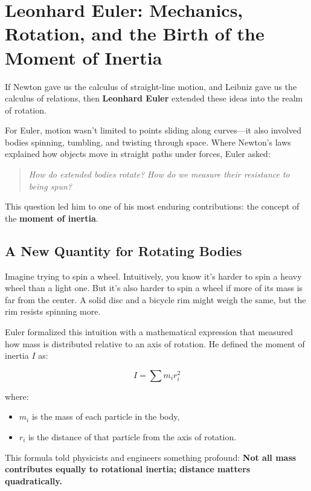 \section{Leonhard Euler: Mechanics, Rotation, and the Birth of the Moment of Inertia}

If Newton gave us the calculus of straight-line motion, and Leibniz gave us the calculus of relations, then \textbf{Leonhard Euler} extended these ideas into the realm of rotation.

For Euler, motion wasn’t limited to points sliding along curves—it also involved bodies spinning, tumbling, and twisting through space. Where Newton’s laws explained how objects move in straight paths under forces, Euler asked:

\begin{quote}
\textit{How do extended bodies rotate? How do we measure their resistance to being spun?}
\end{quote}

This question led him to one of his most enduring contributions: the concept of the \textbf{moment of inertia}.

\subsection{A New Quantity for Rotating Bodies}

Imagine trying to spin a wheel. Intuitively, you know it’s harder to spin a heavy wheel than a light one. But it’s also harder to spin a wheel if more of its mass is far from the center. A solid disc and a bicycle rim might weigh the same, but the rim resists spinning more.

Euler formalized this intuition with a mathematical expression that measured how mass is distributed relative to an axis of rotation. He defined the moment of inertia \( I \) as:

\[
I = \sum m_i r_i^2
\]

where:

\begin{itemize}
    \item \( m_i \) is the mass of each particle in the body,
    \item \( r_i \) is the distance of that particle from the axis of rotation.
\end{itemize}

This formula told physicists and engineers something profound:  
\textbf{Not all mass contributes equally to rotational inertia; distance matters quadratically.}

